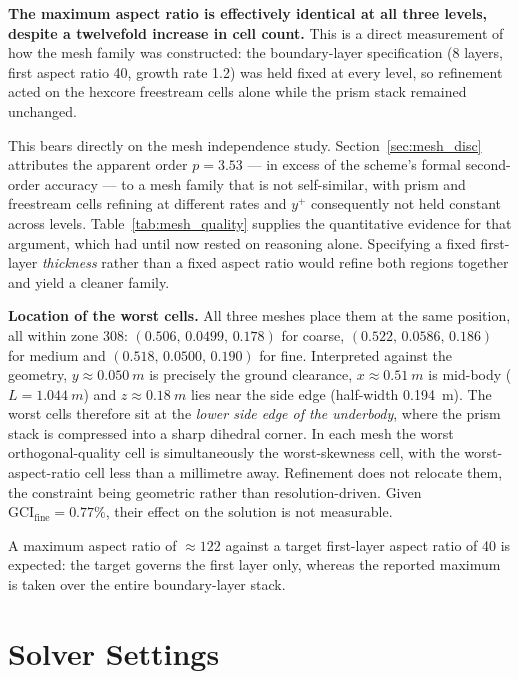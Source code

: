 \documentclass[12pt,a4paper]{article}
\begin{document}
\noindent
\textbf{The maximum aspect ratio is effectively identical at all three levels, despite a twelvefold
increase in cell count.} This is a direct measurement of how the mesh family was constructed: the
boundary-layer specification (8 layers, first aspect ratio 40, growth rate 1.2) was held fixed at
every level, so refinement acted on the hexcore freestream cells alone while the prism stack
remained unchanged.

This bears directly on the mesh independence study. Section~\ref{sec:mesh_disc} attributes the
apparent order $p = 3.53$ — in excess of the scheme's formal second-order accuracy — to a mesh
family that is not self-similar, with prism and freestream cells refining at different rates and
$y^+$ consequently not held constant across levels. Table~\ref{tab:mesh_quality} supplies the
quantitative evidence for that argument, which had until now rested on reasoning alone. Specifying
a fixed first-layer \emph{thickness} rather than a fixed aspect ratio would refine both regions
together and yield a cleaner family.

\begin{sloppypar}
\textbf{Location of the worst cells.} All three meshes place them at the same position, all within
zone 308: $(0.506,\,0.0499,\,0.178)$ for coarse, $(0.522,\,0.0586,\,0.186)$ for medium and
$(0.518,\,0.0500,\,0.190)$ for fine. Interpreted against the geometry,
$y \approx \SI{0.050}{m}$ is precisely the ground clearance, $x \approx \SI{0.51}{m}$ is mid-body
($L = \SI{1.044}{m}$) and $z \approx \SI{0.18}{m}$ lies near the side edge (half-width
\SI{0.194}{m}). The worst cells therefore sit at the \emph{lower side edge of the underbody}, where
the prism stack is compressed into a sharp dihedral corner. In each mesh the worst
orthogonal-quality cell is simultaneously the worst-skewness cell, with the worst-aspect-ratio cell
less than a millimetre away. Refinement does not relocate them, the constraint being geometric
rather than resolution-driven. Given $\text{GCI}_\text{fine} = 0.77\%$, their effect on the solution
is not measurable.
\end{sloppypar}

A maximum aspect ratio of $\approx122$ against a target first-layer aspect ratio of 40 is expected:
the target governs the first layer only, whereas the reported maximum is taken over the entire
boundary-layer stack.

\section{Solver Settings}
\end{document}
